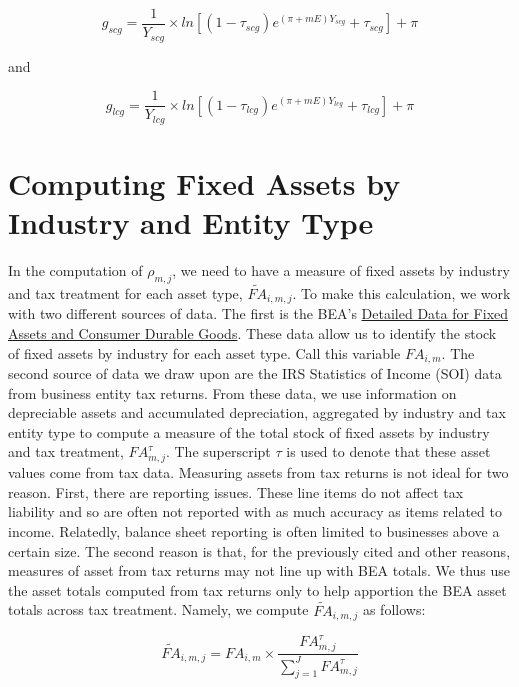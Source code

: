 \documentclass[article,11pt,letterpaper,fleqn]{article}
\theoremstyle{definition}
\numberwithin{equation}{section}
\begin{document}
\begin{equation}
g_{scg} = \frac{1}{Y_{scg}}\times ln\left[(1-\tau_{scg})e^{(\pi+mE)Y_{scg}}+\tau_{scg}\right]+\pi
\end{equation}

\noindent\noindent and

\begin{equation}
g_{lcg} = \frac{1}{Y_{lcg}}\times ln\left[(1-\tau_{lcg})e^{(\pi+mE)Y_{lcg}}+\tau_{lcg}\right]+\pi
\end{equation}


\section{Computing Fixed Assets by Industry and Entity Type}

In the computation of $\rho_{m,j}$, we need to have a measure of fixed assets by industry and tax treatment for each asset type, $\widetilde{FA}_{i,m,j}$.  To make this calculation, we work with two different sources of data.  The first is the BEA's \href{http://www.bea.gov/national/FA2004/Details/Index.html}{Detailed Data for Fixed Assets and Consumer Durable Goods}.  These data allow us to identify the stock of fixed assets by industry for each asset type.  Call this variable $FA_{i,m}$.  The second source of data we draw upon are the IRS Statistics of Income (SOI) data from business entity tax returns.  From these data, we use information on depreciable assets and accumulated depreciation, aggregated by industry and tax entity type to compute a measure of the total stock of fixed assets by industry and tax treatment, $FA^{\tau}_{m,j}$.  The superscript $\tau$ is used to denote that these asset values come from tax data.  Measuring assets from tax returns is not ideal for two reason.  First, there are reporting issues.  These line items do not affect tax liability and so are often not reported with as much accuracy as items related to income.  Relatedly, balance sheet reporting is often limited to businesses above a certain size.  The second reason is that, for the previously cited and other reasons, measures of asset from tax returns may not line up with BEA totals.  We thus use the asset totals computed from tax returns only to help apportion the BEA asset totals across tax treatment.  Namely, we compute $\widetilde{FA}_{i,m,j}$ as follows:

\begin{equation}
\label{eqn:asset_bridge}
\widetilde{FA}_{i,m,j} = FA_{i,m}\times \frac{FA^{\tau}_{m,j}}{\sum_{j=1}^{J} FA^{\tau}_{m,j}}
\end{equation}
\end{document}
